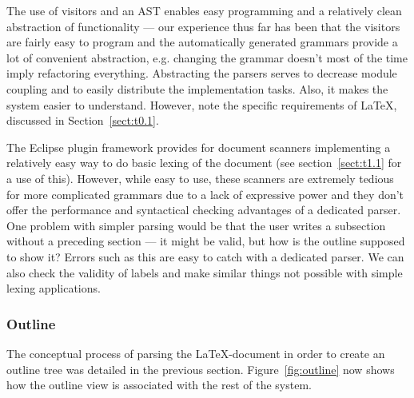 \documentclass[a4paper,11pt,twoside]{article}
\begin{document}

The use of visitors and an AST enables easy programming and a
relatively clean abstraction of functionality --- our experience thus
far has been that the visitors are fairly easy to program and the
automatically generated grammars provide a lot of convenient
abstraction, e.g. changing the grammar doesn't most of the time imply
refactoring everything. Abstracting the parsers serves to decrease
module coupling and to easily distribute the implementation tasks.
Also, it makes the system easier to understand. However, note the
specific requirements of \LaTeX, discussed in Section~\ref{sect:t0.1}.

The Eclipse plugin framework provides for document scanners implementing a 
relatively easy way to do basic lexing of the document (see 
section~\ref{sect:t1.1} for a use of this). However, while easy to use, these 
scanners are extremely tedious for more complicated grammars due to a lack of 
expressive power and they don't offer the performance and syntactical checking 
advantages of a dedicated parser. One problem with simpler parsing would be 
that the user writes a subsection without a preceding section --- it might be 
valid, but how is the outline supposed to show it? Errors such as this are easy 
to catch with a dedicated parser. We can also check the validity of labels and 
make similar things not possible with simple lexing applications.


\subsubsection{Outline}

The conceptual process of parsing the \LaTeX -document in order to create an 
outline tree was detailed in the previous section. Figure~\ref{fig:outline} now 
shows how the outline view is associated with the rest of the system.
\end{document}
